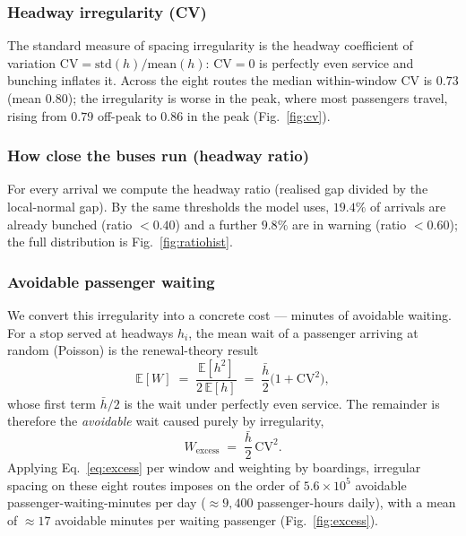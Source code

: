\documentclass[11pt,a4paper]{article}
\begin{document}
\subsubsection{Headway irregularity (CV)}
\label{sec:b-cv}
The standard measure of spacing irregularity is the headway coefficient of variation
$\mathrm{CV} = \mathrm{std}(h)/\mathrm{mean}(h)$: $\mathrm{CV}=0$ is perfectly even service and
bunching inflates it. Across the eight routes the median within-window $\mathrm{CV}$ is $0.73$
(mean $0.80$); the irregularity is worse in the peak, where most passengers travel, rising from
$0.79$ off-peak to $0.86$ in the peak (Fig.~\ref{fig:cv}).

\subsubsection{How close the buses run (headway ratio)}
\label{sec:b-ratio}
For every arrival we compute the headway ratio (realised gap divided by the local-normal gap). By the
same thresholds the model uses, $19.4\%$ of arrivals are already bunched (ratio $<0.40$) and a further
$9.8\%$ are in warning (ratio $<0.60$); the full distribution is Fig.~\ref{fig:ratiohist}.

\subsubsection{Avoidable passenger waiting}
\label{sec:b-wait}
We convert this irregularity into a concrete cost --- minutes of avoidable waiting. For a stop served
at headways $h_i$, the mean wait of a passenger arriving at random (Poisson) is the renewal-theory
result
\begin{equation}
\mathbb{E}[W] \;=\; \frac{\mathbb{E}[h^2]}{2\,\mathbb{E}[h]}
            \;=\; \frac{\bar h}{2}\bigl(1 + \mathrm{CV}^2\bigr),
\label{eq:wait}
\end{equation}
whose first term $\bar h/2$ is the wait under perfectly even service. The remainder is therefore the
\emph{avoidable} wait caused purely by irregularity,
\begin{equation}
W_{\mathrm{excess}} \;=\; \frac{\bar h}{2}\,\mathrm{CV}^2 .
\label{eq:excess}
\end{equation}
Applying Eq.~\eqref{eq:excess} per window and weighting by boardings, irregular spacing on these eight
routes imposes on the order of $5.6\times10^{5}$ avoidable passenger-waiting-minutes per day
($\approx 9{,}400$ passenger-hours daily), with a mean of $\approx 17$ avoidable minutes per waiting
passenger (Fig.~\ref{fig:excess}).
\end{document}
